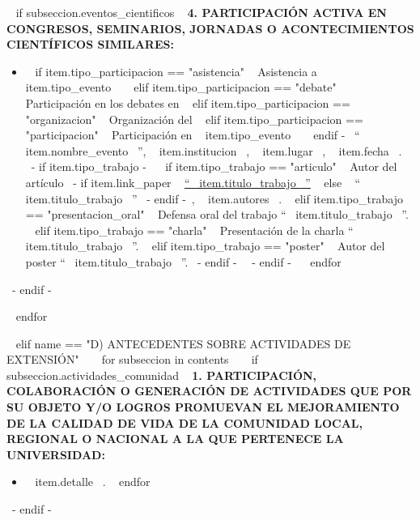     ~{ if subseccion.eventos_cientificos }~
      \textbf{4. PARTICIPACIÓN ACTIVA EN CONGRESOS, SEMINARIOS, JORNADAS O ACONTECIMIENTOS CIENTÍFICOS SIMILARES:}
      \begin{itemize}
      ~{ for item in subseccion.eventos_cientificos }~
        \item ~{ if item.tipo_participacion == "asistencia" }~ Asistencia a ~{{ item.tipo_evento }}~
              ~{ elif item.tipo_participacion == "debate" }~ Participación en los debates en
              ~{ elif item.tipo_participacion == "organizacion" }~ Organización del
              ~{ elif item.tipo_participacion == "participacion" }~ Participación en ~{{ item.tipo_evento }}~ ~{ endif -}~
              ``~{{ item.nombre_evento }}~'', ~{{ item.institucion }}~, ~{{ item.lugar }}~, ~{{ item.fecha }}~.
              ~{- if item.tipo_trabajo -}~
                ~{ if item.tipo_trabajo == "articulo" }~ Autor del artículo ~{- if item.link_paper }~ \href{~{{ item.link_paper }}~}{``~{{ item.titulo_trabajo }}~''} ~{ else }~ ``~{{ item.titulo_trabajo }}~'' ~{- endif -}~, ~{{ item.autores }}~.
                ~{ elif item.tipo_trabajo == "presentacion_oral" }~ Defensa oral del trabajo ``~{{ item.titulo_trabajo }}~''.
                ~{ elif item.tipo_trabajo == "charla" }~ Presentación de la charla ``~{{ item.titulo_trabajo }}~''.
                ~{ elif item.tipo_trabajo == "poster" }~ Autor del poster ``~{{ item.titulo_trabajo }}~''. ~{- endif -}~
              ~{- endif -}~
        \espacioEntreItems{}
      ~{ endfor }~
      \end{itemize}
      \espacioEntreSubSecciones{}
    ~{- endif -}~

  ~{ endfor }~
  \espacioEntreSecciones{}


~{ elif name == "D) ANTECEDENTES SOBRE ACTIVIDADES DE EXTENSIÓN" }~
  ~{ for subseccion in contents }~
    ~{ if subseccion.actividades_comunidad }~
      \textbf{1. PARTICIPACIÓN, COLABORACIÓN O GENERACIÓN DE ACTIVIDADES QUE POR SU OBJETO Y/O LOGROS PROMUEVAN EL MEJORAMIENTO DE LA CALIDAD DE VIDA DE LA  COMUNIDAD LOCAL, REGIONAL O NACIONAL A LA QUE PERTENECE LA UNIVERSIDAD:}
      \begin{itemize}
      ~{ for item in subseccion.actividades_comunidad }~
        \item ~{{ item.detalle }}~.
        \espacioEntreItems{}
      ~{ endfor }~
      \end{itemize}
      \espacioEntreSubSecciones{}
    ~{- endif -}~

